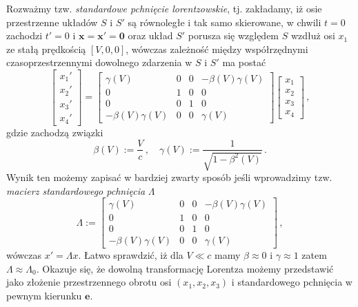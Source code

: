 \documentclass[../main.tex]{subfiles}
\begin{document}
Rozważmy tzw. \textit{standardowe pchnięcie lorentzowskie}, tj. zakładamy, iż osie przestrzenne
układów \(S\) i \(S'\) są równoległe i tak samo skierowane, w chwili \(t=0\) zachodzi \(t'=0\) i
\(\mathbf{x}=\mathbf{x}'=\mathbf{0}\) oraz układ \(S'\) porusza się względem \(S\) wzdłuż osi
\(x_1\) ze stałą prędkością \([V,0,0]\), wówczas zależność między współrzędnymi czasoprzestrzennymi
dowolnego zdarzenia w \(S\) i \(S'\) ma postać
\begin{equation*}
    \left[\begin{array}{c}
         x_1'  \\
         x_2'\\
         x_3'\\
         x_4'
    \end{array}\right]=
    \left[\begin{array}{cccc}
         \gamma(V)&0&0&-\beta(V)\gamma(V)  \\
         0&1&0&0  \\
         0&0&1&0  \\
         -\beta(V)\gamma(V)&0&0&\gamma(V)
    \end{array}\right]\left[\begin{array}{cc}
         x_1  \\
         x_2\\
         x_3\\
         x_4
    \end{array}\right]\,,
\end{equation*}
gdzie zachodzą związki
\begin{equation*}
    \beta(V):=\frac{V}{c}\,,\quad \gamma(V):=\frac{1}{\sqrt{1-\beta^2(V)}}\,.
\end{equation*}
Wynik ten możemy zapisać w bardziej zwarty sposób jeśli wprowadzimy tzw. \textit{macierz
standardowego pchnięcia} \(\Lambda\)
\begin{equation*}
    \Lambda:=\left[\begin{array}{cccc}
         \gamma(V)&0&0&-\beta(V)\gamma(V)  \\
         0&1&0&0  \\
         0&0&1&0  \\
         -\beta(V)\gamma(V)&0&0&\gamma(V)
    \end{array}\right]\,,
\end{equation*}
wówczas \(x'=\Lambda x\). Łatwo sprawdzić, iż dla \(V\ll c\) mamy \(\beta\approx0\) i
\(\gamma\approx 1\) zatem \(\Lambda\approx\Lambda_0\). Okazuje się, że dowolną transformację
Lorentza możemy przedstawić jako złożenie przestrzennego obrotu osi \((x_1,x_2,x_3)\) i
standardowego pchnięcia w pewnym kierunku \(\mathbf{e}\).
\end{document}
